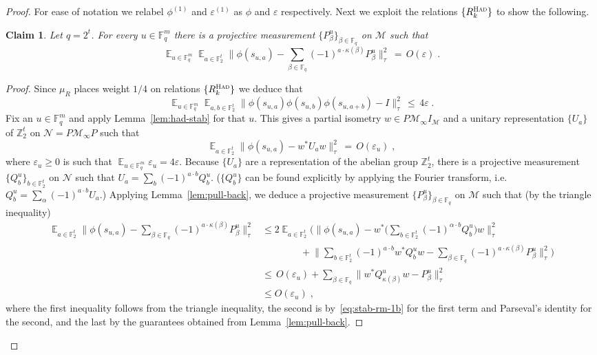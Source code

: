 \documentclass[11pt]{article}
\newtheorem{claim}[theorem]{Claim}
\theoremstyle{definition}
\newcommand{\Id}{\ensuremath{I}}
\DeclareMathOperator*{\Expectation}{\mathbb{E}}
\newcommand{\Es}[1]{\Expectation_{#1}}
\newcommand{\F}{\ensuremath{\mathbb{F}}}
\newcommand{\Z}{\ensuremath{\mathbb{Z}}}
\newcommand{\mM}{\ensuremath{\mathcal{M}}}
\newcommand{\had}{\textsc{Had}}
\newcommand{\eps}{\varepsilon}
\newcommand{\mN}{\mathcal{N}}
\begin{document}
\begin{proof}
For ease of notation we relabel $\phi^{(1)}$ and $\eps^{(1)}$ as $\phi$ and $\eps$ respectively. Next we exploit the relations $\{R^\had_k\}$ to show the following. 

\begin{claim}\label{claim:z2-stab-2}
Let $q=2^t$. 
For every $u\in \F_q^m$ there is a projective measurement $\{P^u_\beta\}_{\beta\in \F_{q}}$ on $\mM$ such that 
\begin{equation}\label{eq:z2-stab-2}
 \Es{u\in \F_q^m} \Es{a\in \F_2^t} \Big\| \phi(s_{u,a}) - \sum_{\beta\in\F_q} (-1)^{a \cdot \kappa(\beta)} P^u_\beta \Big\|_\tau^2 \,=\, O(\eps)\;. 
\end{equation}
\end{claim}

\begin{proof}
Since $\mu_R$ places weight $1/4$ on relations $\{R^\had_k\}$ we deduce that 
\begin{equation}\label{eq:stab-rm-1}
\Es{u\in \F_q^m} \Es{a,b\in \F_2^t} \big\|\phi(s_{u,a})\phi(s_{u,b})\phi(s_{u,a+b})-\Id\big\|_\tau^2 \,\leq\, 4\eps\;. 
\end{equation}
Fix an $u\in \F_q^m$ and apply Lemma~\ref{lem:had-stab} for that $u$. This gives a partial isometry $w\in P\mM_\infty\Id_\mM$ and a unitary representation $\{U_a\}$ of $\Z_2^t$ on $\mN=P\mM_\infty P$ such that 
\begin{equation}\label{eq:stab-rm-1b}
 \Es{a \in \F_2^t} \big\| \phi(s_{u,a}) - w^* U_a w \big\|_\tau^2 \,=\, O(\eps_u)\;,
\end{equation}
where $\eps_u\geq 0$ is such that $\Es{u\in \F_q^m} \eps_u = 4\eps$. Because $\{U_a\}$ are a representation of the abelian group $\Z_2^t$, there is a projective measurement $\{Q^u_b\}_{b\in \F_2^t}$ on $\mN$ such that $U_a = \sum_b (-1)^{a\cdot b} Q^u_b$. ($\{Q^u_b\}$ can be found explicitly by applying the Fourier transform, i.e.\ $Q^u_b = \sum_\alpha (-1)^{a \cdot b} U_a$.) Applying Lemma~\ref{lem:pull-back}, we deduce a projective measurement $\{P^u_\beta\}_{\beta\in \F_q}$ on $\mM$ such that (by the triangle inequality)
\begin{align*}
 \Es{a \in \F_2^t} \Big\| \phi(s_{u,a}) - \sum_{\beta\in\F_q} (-1)^{a \cdot \kappa(\beta)} P^u_\beta \Big\|_\tau^2
&\leq 2 \Es{a \in \F_2^t} \Big( \Big\| \phi(s_{u,a}) - w^*\Big(\sum_{b\in\F_2^t} (-1)^{\alpha \cdot b} Q^u_b \Big) w \Big\|_\tau^2 \\
&\qquad\qquad+   \Big\|  \sum_{b\in\F_2^t} (-1)^{a \cdot b} w^* Q^u_b w - \sum_{\beta\in\F_q} (-1)^{a \cdot \kappa(\beta)} P^u_\beta \Big\|_\tau^2\Big)\\
 &\leq\, O(\eps_u) +  \sum_{\beta\in\F_q} \Big\| w^* Q^u_{\kappa(\beta)} w - P^u_{\beta} \Big\|_\tau^2\\
&\leq O(\eps_u)\;,
\end{align*}
where the first inequality follows from the triangle inequality, the second is by~\eqref{eq:stab-rm-1b} for the first term and Parseval's identity for the second, and the last by the guarantees obtained from Lemma~\ref{lem:pull-back}.
\end{proof}


\end{proof}
\end{document}
